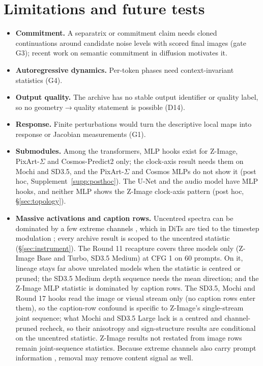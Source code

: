 \documentclass[11pt]{article}
\begin{document}
\section{Limitations and future tests}\label{sec:limits}
\begin{itemize}
 \item \textbf{Commitment.} A separatrix or commitment claim needs cloned continuations around candidate noise levels with scored final images (gate G3); recent work on semantic commitment in diffusion \citep{handke2026entropic,raya2023spontaneous} motivates it.
 \item \textbf{Autoregressive dynamics.} Per-token phases need context-invariant statistics (G4).
 \item \textbf{Output quality.} The archive has no stable output identifier or quality label, so no geometry$\to$quality statement is possible (D14).
 \item \textbf{Response.} Finite perturbations would turn the descriptive local maps into response or Jacobian measurements (G1).
 \item \textbf{Submodules.} Among the transformers, MLP hooks exist for Z-Image, PixArt-$\Sigma$ and Cosmos-Predict2 only; the clock-axis result needs them on Mochi and SD3.5, and the PixArt-$\Sigma$ and Cosmos MLPs do not show it (post hoc, Supplement~\ref{supp:posthoc}). The U-Net and the audio model have MLP hooks, and neither MLP shows the Z-Image clock-axis pattern (post hoc, \S\ref{sec:topology}).
 \item \textbf{Massive activations and caption rows.} Uncentred spectra can be dominated by a few extreme channels \citep{sun2024massive,sun2026anatomy}, which in DiTs are tied to the timestep modulation \citep{gan2025massive,gan2025unleashing}; every archive result is scoped to the uncentred statistic (\S\ref{sec:instrument}). The Round 11 recapture covers three models only (Z-Image Base and Turbo, SD3.5 Medium) at CFG 1 on 60 prompts. On it, lineage stays far above unrelated models when the statistic is centred or pruned; the SD3.5 Medium depth sequence needs the mean direction; and the Z-Image MLP statistic is dominated by caption rows. The SD3.5, Mochi and Round 17 hooks read the image or visual stream only (no caption rows enter them), so the caption-row confound is specific to Z-Image's single-stream joint sequence; what Mochi and SD3.5 Large lack is a centred and channel-pruned recheck, so their anisotropy and sign-structure results are conditional on the uncentred statistic. Z-Image results not restated from image rows remain joint-sequence statistics. Because extreme channels also carry prompt information \citep{turri2026few}, removal may remove content signal as well.

\end{itemize}
\end{document}
